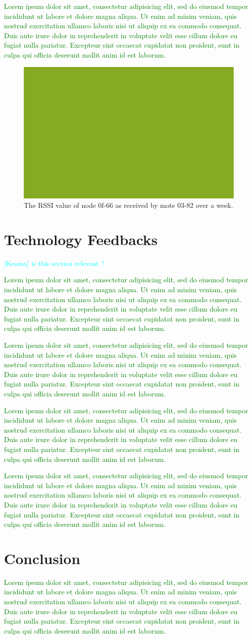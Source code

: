 \documentclass{sig-alternate}
\newcommand{\lorem}               {\textcolor{green}{Lorem ipsum dolor sit amet, consectetur adipisicing elit, sed do eiusmod tempor incididunt ut labore et dolore magna aliqua. Ut enim ad minim veniam, quis nostrud exercitation ullamco laboris nisi ut aliquip ex ea commodo consequat. Duis aute irure dolor in reprehenderit in voluptate velit esse cillum dolore eu fugiat nulla pariatur. Excepteur sint occaecat cupidatat non proident, sunt in culpa qui officia deserunt mollit anim id est laborum.}}
\newcommand{\keoma}[1]              {\textcolor{cyan}{[Keoma] #1}}
\begin{document}
\lorem

\begin{figure}
    \centering
    \includegraphics[width=\columnwidth]{fake}
    \caption{The RSSI value of node 0f-66 as received by mote 03-82 over a week.}
    \label{fig:reliability}
\end{figure}

\section{Technology Feedbacks}
\label{sec:technology}
\keoma{is this section relevant ?}

\lorem


\lorem


\lorem


\lorem

\section{Conclusion}
\label{sec:conclusion}


\lorem




\end{document}

